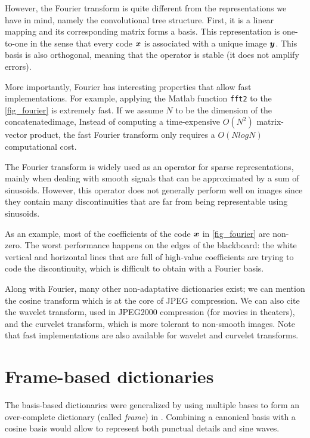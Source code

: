 However, the Fourier transform is quite different from the representations we have in mind, namely the convolutional tree structure. First, it is a linear mapping and its corresponding matrix forms a basis. This representation is one-to-one in the sense that every code $\bm x$ is associated with a unique image $\bm y$. This basis is also orthogonal, meaning that the operator is stable (it does not amplify errors). %

More importantly, Fourier has interesting properties that allow fast implementations. For example, applying the Matlab function \texttt{fft2} to the \cref{fig_fourier} is extremely fast. If we assume $N$ to be the dimension of the concatenated\footnotemark[1] image, Instead of computing a time-expensive $O(N^2)$ matrix-vector product, the fast Fourier transform only requires a $O(NlogN)$ computational cost.



The Fourier transform is widely used as an operator for sparse representations, mainly when dealing with smooth signals that can be approximated by a sum of sinusoids. However, this operator does not generally perform well on images since they contain many discontinuities that are far from being representable using sinusoids.

As an example, most of the coefficients of the code $\bm x$ in \cref{fig_fourier} are non-zero. The worst performance happens on the edges of the blackboard: the white vertical and horizontal lines that are full of high-value coefficients are trying to code the discontinuity, which is difficult to obtain with a Fourier basis.

Along with Fourier, many other non-adaptative dictionaries exist; we can mention the cosine transform which is at the core of JPEG compression. We can also cite the wavelet transform, used in JPEG2000 compression (for movies in theaters), and the curvelet transform, which is more tolerant to non-smooth images. Note that fast implementations are also available for wavelet and curvelet transforms.


\section{Frame-based dictionaries}

The basis-based dictionaries were generalized by using multiple bases to form an over-complete dictionary (called \emph{frame}) in \cite{chen_atomic_2001}. Combining a canonical basis with a cosine basis would allow to represent both punctual details and sine waves.

